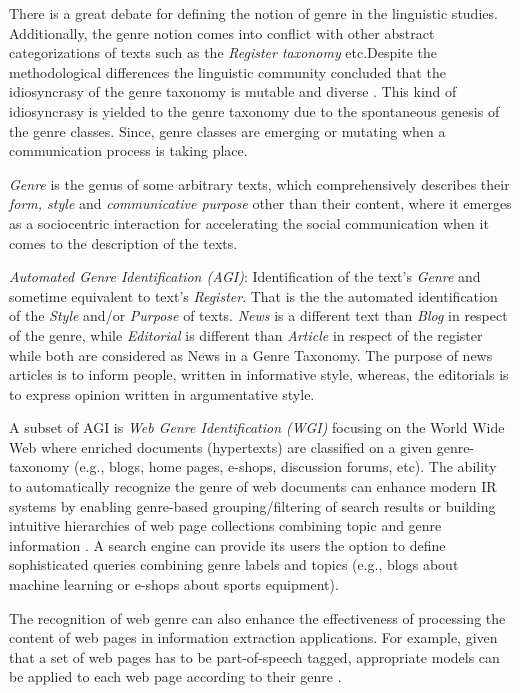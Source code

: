 There is a great debate for defining the notion of genre in the linguistic studies. Additionally, the genre notion comes into conflict with other abstract categorizations of texts such as the \textit{Register taxonomy} etc.Despite the methodological differences the linguistic community concluded that the idiosyncrasy of the genre taxonomy is mutable and diverse \parencite{coutinho2009describe}. This kind of idiosyncrasy is yielded to the genre taxonomy due to the spontaneous genesis of the genre classes. Since, genre classes are emerging or mutating when a communication process is taking place.

\begin{definition}{\textit{Genre}}
is the genus of some arbitrary texts, which comprehensively describes their \textit{form, style} and \textit{communicative purpose} other than their content, where it emerges as a sociocentric interaction for accelerating the social communication when it comes to the description of the texts.
\end{definition}

\textit{Automated Genre Identification (AGI)}: Identification of the text's \textit{Genre} and sometime equivalent to text's \textit{Register}. That is the the automated identification of the \textit{Style} and/or \textit{Purpose} of texts. \textit{News} is a different text than \textit{Blog} in respect of the genre, while \textit{Editorial} is different than \textit{Article} in respect of the register while both are considered as News in a Genre Taxonomy. The purpose of news articles is to inform people, written in informative style, whereas, the editorials is to express opinion written in argumentative style.

A subset of AGI is \textit{Web Genre Identification (WGI)} focusing on the World Wide Web where enriched documents (hypertexts) are classified on a given genre-taxonomy (e.g., blogs, home pages, e-shops, discussion forums, etc). The ability to automatically recognize the genre of web documents can enhance modern IR systems by enabling genre-based grouping/filtering of search results or building intuitive hierarchies of web page collections combining topic and genre information \parencite{Braslavski2007,Rosso2008,de2009genre}. A search engine can provide its users the option to define sophisticated queries combining genre labels and topics (e.g., blogs about machine learning or e-shops about sports equipment). 

The recognition of web genre can also enhance the effectiveness of processing the content of web pages in information extraction applications. For example, given that a set of web pages has to be part-of-speech tagged, appropriate models can be applied to each web page according to their genre \parencite{Nooralahzadeh2014}.

